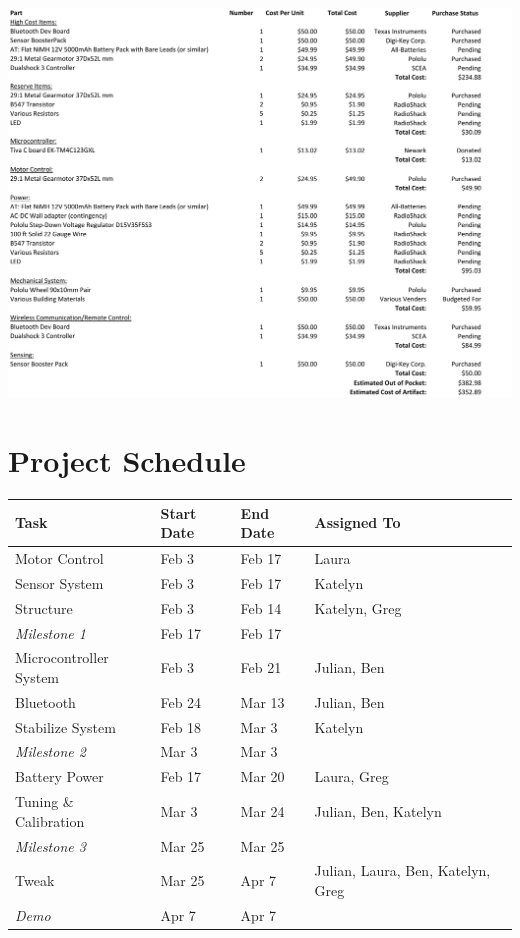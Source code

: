 \documentclass[11pt]{report}
\begin{document}
\begin{spacing}{1.5}
    {
    \centering
    \includegraphics[width=\textwidth]{CostAccounting}
    }

\section*{Project Schedule} %

\begin{tabular}{lllll}

Task & Start Date & End Date & Assigned To \\
\hline
Motor Control & Feb 3 & Feb 17 & Laura \\
Sensor System &	Feb 3 &	Feb 17 &			Katelyn \\
Structure	& Feb 3	& Feb 14 &			Katelyn, Greg \\
\textit{Milestone 1}	& Feb 17 &	Feb 17		\\		
Microcontroller System	& Feb 3	& Feb 21 &	 Julian, Ben \\
Bluetooth	& Feb 24 & 	Mar 13	& 	Julian, Ben \\
Stabilize System	& Feb 18	& Mar 3	 	& Katelyn \\
\textit{Milestone 2} &	Mar 3 &	Mar 3	 \\			
Battery Power	& Feb 17 &	Mar 20 &	 Laura, Greg \\
Tuning \& Calibration	& Mar 3	& Mar 24 &		Julian, Ben, Katelyn \\
\textit{Milestone 3}	& Mar 25	& Mar 25				 \\
Tweak	& Mar 25 &	Apr 7 &	Julian, Laura, Ben, Katelyn, Greg \\
\textit{Demo} & Apr 7 & Apr 7 \\				



\end{tabular}
\end{spacing}
\end{document}
